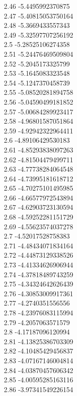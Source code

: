 {2.46	-5.4495992370875\\
2.47	-5.40815053750164\\
2.48	-5.3669433557343\\
2.49	-5.32597707256192\\
2.5	-5.28525106274358\\
2.51	-5.24476469509804\\
2.52	-5.2045173325799\\
2.53	-5.1645083323548\\
2.54	-5.1247370458739\\
2.55	-5.08520281894758\\
2.56	-5.04590499181852\\
2.57	-5.00684289923417\\
2.58	-4.96801587051864\\
2.59	-4.92942322964411\\
2.6	-4.89106429530183\\
2.61	-4.85293838097263\\
2.62	-4.81504479499711\\
2.63	-4.77738284064548\\
2.64	-4.73995181618712\\
2.65	-4.70275101495985\\
2.66	-4.66577972543894\\
2.67	-4.62903723130594\\
2.68	-4.59252281151729\\
2.69	-4.55623574037278\\
2.7	-4.52017528758383\\
2.71	-4.48434071834164\\
2.72	-4.44873129338526\\
2.73	-4.41334626906944\\
2.74	-4.37818489743259\\
2.75	-4.34324642626439\\
2.76	-4.30853009917361\\
2.77	-4.2740351556556\\
2.78	-4.23976083115994\\
2.79	-4.2057063571579\\
2.8	-4.17187096120994\\
2.81	-4.13825386703309\\
2.82	-4.10485429456837\\
2.83	-4.07167146004814\\
2.84	-4.03870457606342\\
2.85	-4.00595285163116\\
2.86	-3.97341549226154\\
}
